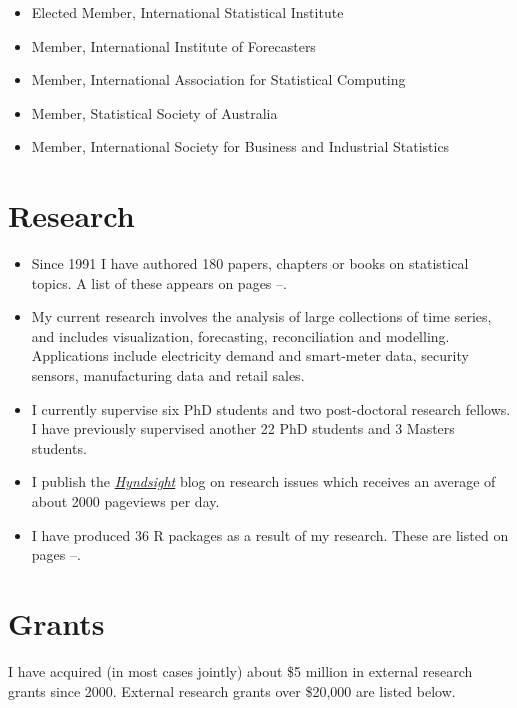\documentclass[10pt,a4paper,]{article}
\providecommand{\tightlist}{%
  \setlength{\itemsep}{0pt}\setlength{\parskip}{0pt}}
\newcounter{papers}
\begin{document}
\begin{itemize}
\tightlist
\item
  Elected Member, International Statistical Institute
\item
  Member, International Institute of Forecasters
\item
  Member, International Association for Statistical Computing
\item
  Member, Statistical Society of Australia
\item
  Member, International Society for Business and Industrial Statistics
\end{itemize}

\hypertarget{research}{%
\section{Research}\label{research}}

\begin{itemize}
\tightlist
\item
  Since 1991 I have authored 180 papers, chapters or books on
  statistical topics. A list of these appears on pages
  \pageref{papersstart}--\pageref{papersend}.
\item
  My current research involves the analysis of large collections of time
  series, and includes visualization, forecasting, reconciliation and
  modelling. Applications include electricity demand and smart-meter
  data, security sensors, manufacturing data and retail sales.
\item
  I currently supervise six PhD students and two post-doctoral research
  fellows. I have previously supervised another 22 PhD students and 3
  Masters students.
\item
  I publish the
  \href{https://robjhyndman.com/hyndsight}{\emph{Hyndsight}} blog on
  research issues which receives an average of about 2000 pageviews per
  day.
\item
  I have produced 36 R packages as a result of my research. These are
  listed on pages \pageref{packagestart}--\pageref{packageend}.
\end{itemize}

\newpage

\hypertarget{grants}{%
\section{Grants}\label{grants}}

I have acquired (in most cases jointly) about \$5 million in external
research grants since 2000. External research grants over \$20,000 are
listed below.
\end{document}
